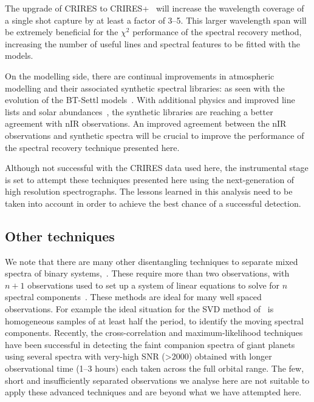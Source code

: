 \documentclass[fleqn,usenatbib]{mnras}
\newcommand*\bl{\color{blue}}
\begin{document}
    The upgrade of CRIRES to CRIRES+~\citep{dorn_crires_2016} will increase the wavelength coverage of a single shot capture by at least a factor of 3--5. This larger wavelength span will be extremely beneficial for the \(\chi^2\) performance of the spectral recovery method, increasing the number of useful lines and spectral features to be fitted with the models.
    
    On the modelling side, there are continual improvements in atmospheric modelling and their associated synthetic spectral libraries: as seen with the evolution of the {BT-Settl} models~\citep{allard_btsettl_2013}. With additional physics and improved line lists and solar abundances~\citep[e.g.][]{asplund_chemical_2009,caffau_solar_2011}, the synthetic libraries are reaching a better agreement with nIR observations. An improved agreement between the nIR observations and synthetic spectra will be crucial to improve the performance of the spectral recovery technique presented here.
    
    Although not successful with the CRIRES data used here, the instrumental stage is set to attempt these techniques presented here using the next-generation of high resolution spectrographs. The lessons learned in this analysis need to be taken into account in order to achieve the best chance of a successful detection.
    
    
    \subsection{Other techniques}
    We note that there are many other disentangling techniques to separate mixed spectra of binary systems,~\citep[e.g.][]{hadrava_disentangling_2009}. These require more than two observations, with  \(n+1\) observations used to set up a system of linear equations to solve for \(n\) spectral components~\citep[e.g.][]{simon_disentangling_1994,czekala_disentangling_2017, sablowski_spectral_2016}. These methods are ideal for many well spaced observations. For example the ideal situation for the SVD method of~\citet{sablowski_spectral_2016} is homogeneous samples of at least half the period, to identify the moving spectral components.
    {\bl Recently, the cross-correlation and maximum-likelihood techniques~\citep[e.g.][]{lockwood_nearir_2014, piskorz_evidence_2016} have been successful in detecting the faint companion spectra of giant planets using several spectra with very-high SNR (>2000) obtained with longer observational time (1--3 hours) each taken across the full orbital range.} The few, short and insufficiently separated observations we analyse here are not suitable to apply these advanced techniques and are beyond what we have attempted here.
    
\end{document}
